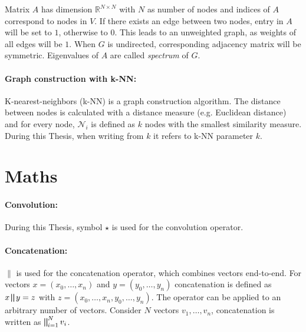 Matrix $A$ has dimension $\mathbb{R}^{N \times N}$ with $N$ as number of nodes
and indices of $A$ correspond to nodes in $V$.
If there exists an edge between two nodes, entry in $A$ will be set to $1$, otherwise to $0$.
This leads to an unweighted graph, as weights of all edges will be $1$.
When $G$ is undirected, corresponding adjacency matrix will be symmetric. 
Eigenvalues of $A$ are called \textit{spectrum} of $G$.

\paragraph{Graph construction with k-NN:}
K-nearest-neighbors (k-NN) is a graph construction algorithm. The distance between
nodes is calculated with a distance measure (e.g. Euclidean distance) and 
for every node, $\mathcal{N}_i$ is defined as $k$ nodes with the smallest similarity measure.
During this Thesis, when writing from $k$ it refers to k-NN parameter $k$.


\section{Maths}
\paragraph{Convolution:}
During this Thesis, symbol $\star$ is used for the convolution operator.

\paragraph{Concatenation:}
$\parallel$ is used for the concatenation operator, which combines vectors end-to-end. 
For vectors $x=(x_0, \dots, x_n)$ and $y=(y_0, \dots, y_n)$ concatenation is defined as 
$ x \bigparallel y = z$ with $z=(x_0, \dots, x_n, y_0, \dots, y_n) $. 
The operator can be applied to an arbitrary number of vectors.
Consider $N$ vectors $v_1, \dots, v_n$, concatenation is written as  $\bigparallel^N_{i=1} v_i$.
